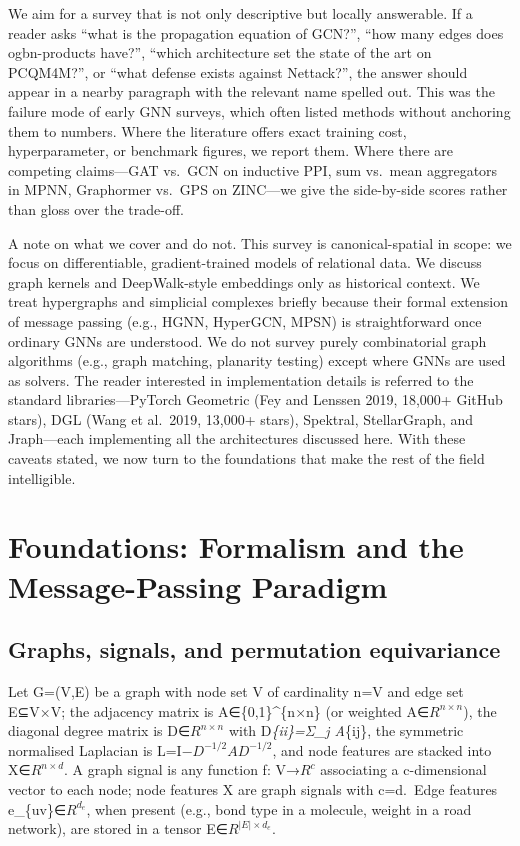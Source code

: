 \documentclass{article}
\begin{document}
We aim for a survey that is not only descriptive but locally answerable. If a reader asks ``what is the propagation equation of GCN?'', ``how many edges does ogbn-products have?'', ``which architecture set the state of the art on PCQM4M?'', or ``what defense exists against Nettack?'', the answer should appear in a nearby paragraph with the relevant name spelled out. This was the failure mode of early GNN surveys, which often listed methods without anchoring them to numbers. Where the literature offers exact training cost, hyperparameter, or benchmark figures, we report them. Where there are competing claims---GAT vs.~GCN on inductive PPI, sum vs.~mean aggregators in MPNN, Graphormer vs.~GPS on ZINC---we give the side-by-side scores rather than gloss over the trade-off.

A note on what we cover and do not. This survey is canonical-spatial in scope: we focus on differentiable, gradient-trained models of relational data. We discuss graph kernels and DeepWalk-style embeddings only as historical context. We treat hypergraphs and simplicial complexes briefly because their formal extension of message passing (e.g., HGNN, HyperGCN, MPSN) is straightforward once ordinary GNNs are understood. We do not survey purely combinatorial graph algorithms (e.g., graph matching, planarity testing) except where GNNs are used as solvers. The reader interested in implementation details is referred to the standard libraries---PyTorch Geometric (Fey and Lenssen 2019, 18,000+ GitHub stars), DGL (Wang et al.~2019, 13,000+ stars), Spektral, StellarGraph, and Jraph---each implementing all the architectures discussed here. With these caveats stated, we now turn to the foundations that make the rest of the field intelligible.
\section{Foundations: Formalism and the Message-Passing Paradigm}\label{sec:foundations-formalism-and-the-message-passing-paradigm}
\subsection{Graphs, signals, and permutation equivariance}\label{graphs-signals-and-permutation-equivariance}

Let G=(V,E) be a graph with node set V of cardinality n=\textbar V\textbar{} and edge set E⊆V×V; the adjacency matrix is A∈\{0,1\}\^{}\{n×n\} (or weighted A∈\(R^{n×n}\)), the diagonal degree matrix is D∈\(R^{n×n}\) with D\emph{\{ii\}=Σ\_j A}\{ij\}, the symmetric normalised Laplacian is L=I−\(D^{−1/2}\)\(AD^{−1/2}\), and node features are stacked into X∈\(R^{n×d}\). A graph signal is any function f: V→\(R^c\) associating a c-dimensional vector to each node; node features X are graph signals with c=d.~Edge features e\_\{uv\}∈\(R^{d_e}\), when present (e.g., bond type in a molecule, weight in a road network), are stored in a tensor E∈\(R^{|E|×d_e}\).
\end{document}
